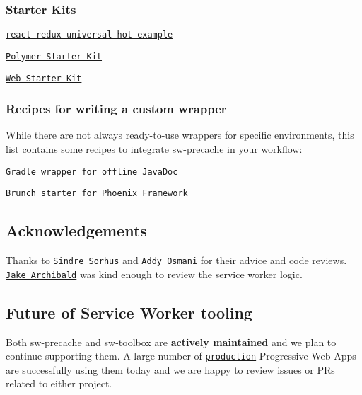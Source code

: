 \subsubsection*{Starter Kits}


\begin{DoxyItemize}
\item \href{https://github.com/bertho-zero/react-redux-universal-hot-example}{\tt {\ttfamily react-\/redux-\/universal-\/hot-\/example}}
\item \href{https://github.com/polymerelements/polymer-starter-kit}{\tt Polymer Starter Kit}
\item \href{https://github.com/google/web-starter-kit}{\tt Web Starter Kit}
\end{DoxyItemize}

\subsubsection*{Recipes for writing a custom wrapper}

While there are not always ready-\/to-\/use wrappers for specific environments, this list contains some recipes to integrate {\ttfamily sw-\/precache} in your workflow\+:


\begin{DoxyItemize}
\item \href{https://gist.github.com/TimvdLippe/4c39b99e3b0ffbcdd8814a31e2969ed1}{\tt Gradle wrapper for offline Java\+Doc}
\item \href{https://gist.github.com/natecox/b19c4e08408a5bf0d4cf4d74f1902260}{\tt Brunch starter for Phoenix Framework}
\end{DoxyItemize}

\subsection*{Acknowledgements}

Thanks to \href{https://github.com/sindresorhus}{\tt Sindre Sorhus} and \href{https://github.com/addyosmani}{\tt Addy Osmani} for their advice and code reviews. \href{https://github.com/jakearchibald}{\tt Jake Archibald} was kind enough to review the service worker logic.

\subsection*{Future of Service Worker tooling}

Both sw-\/precache and sw-\/toolbox are {\bfseries actively maintained} and we plan to continue supporting them. A large number of \href{https://medium.com/dev-channel/progressive-web-app-libraries-in-production-b52cad37d34#.16kxwhu92}{\tt production} Progressive Web Apps are successfully using them today and we are happy to review issues or P\+Rs related to either project.

